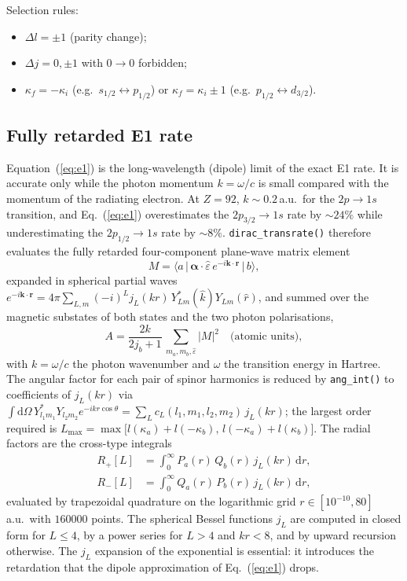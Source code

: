 \documentclass[11pt,a4paper]{article}
\newcommand{\dif}{\mathrm{d}}
\renewcommand{\vec}[1]{\bm{#1}}
\begin{document}
Selection rules:
\begin{itemize}
  \item $\Delta l = \pm1$ (parity change);
  \item $\Delta j = 0,\pm1$ with $0\to0$ forbidden;
  \item $\kappa_{f} = -\kappa_{i}$ (e.g.\ $s_{1/2}\leftrightarrow p_{1/2}$)
    or $\kappa_{f} = \kappa_{i}\pm1$ (e.g.\ $p_{1/2}\leftrightarrow d_{3/2}$).
\end{itemize}

\subsection{Fully retarded E1 rate}
\label{sec:retarded}

Equation~(\ref{eq:e1}) is the long-wavelength (dipole) limit of the exact
E1 rate.  It is accurate only while the photon momentum $k=\omega/c$ is
small compared with the momentum of the radiating electron.  At $Z=92$,
$k\sim0.2$\,a.u.\ for the $2p\to1s$ transition, and
Eq.~(\ref{eq:e1}) overestimates the $2p_{3/2}\to1s$ rate by $\sim24\%$
while underestimating the $2p_{1/2}\to1s$ rate by $\sim8\%$.
{\tt dirac\_transrate()} therefore evaluates the fully retarded
four-component plane-wave matrix element
\begin{equation}
  M = \bigl\langle a\,\bigl|\,\bm{\alpha}\cdot\hat{\varepsilon}\,
      e^{-i\vec{k}\cdot\vec{r}}\,\bigr|\,b\bigr\rangle,
\end{equation}
expanded in spherical partial waves
$e^{-i\vec{k}\cdot\vec{r}} = 4\pi\sum_{L,m}(-i)^{L}j_{L}(kr)\,
Y^{*}_{Lm}(\hat{k})Y_{Lm}(\hat{r})$, and summed over the magnetic
substates of both states and the two photon polarisations,
\begin{equation}
  A = \frac{2k}{2j_{b}+1}\,
      \sum_{m_{a},m_{b},\hat{\varepsilon}}|M|^{2}\quad\text{(atomic units)},
  \label{eq:retarded}
\end{equation}
with $k=\omega/c$ the photon wavenumber and $\omega$ the transition energy
in Hartree.  The angular factor for each pair of spinor harmonics is
reduced by {\tt ang\_int()} to coefficients of $j_{L}(kr)$ via
$\int\dif\Omega\,Y^{*}_{l_{1}m_{1}}Y_{l_{2}m_{2}}e^{-ikr\cos\theta}
= \sum_{L}c_{L}(l_{1},m_{1},l_{2},m_{2})\,j_{L}(kr)$; the largest order
required is
$L_{\max}=\max\bigl[l(\kappa_{a})+l(-\kappa_{b}),\,
l(-\kappa_{a})+l(\kappa_{b})\bigr]$.
The radial factors are the cross-type integrals
\begin{align}
  R_{+}[L] &= \int_{0}^{\infty}\!P_{a}(r)\,Q_{b}(r)\,j_{L}(kr)\,\dif r,\\
  R_{-}[L] &= \int_{0}^{\infty}\!Q_{a}(r)\,P_{b}(r)\,j_{L}(kr)\,\dif r,
\end{align}
evaluated by trapezoidal quadrature on the logarithmic grid
$r\in[10^{-10},80]$\,a.u.\ with $160000$ points.  The spherical Bessel
functions $j_{L}$ are computed in closed form for $L\le4$, by a power
series for $L>4$ and $kr<8$, and by upward recursion otherwise.  The
$j_{L}$ expansion of the exponential is essential: it introduces the
retardation that the dipole approximation of Eq.~(\ref{eq:e1}) drops.
\end{document}
